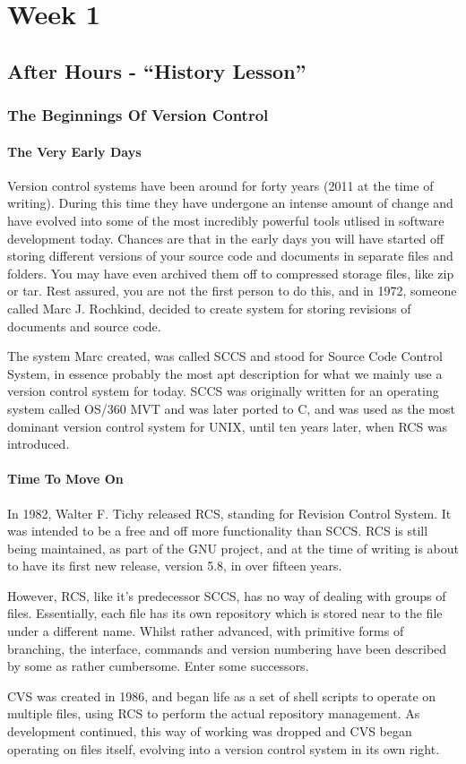 \chapter{Week 1}
\section{After Hours - ``History Lesson''}
\subsection{The Beginnings Of Version Control}

\subsubsection{The Very Early Days}
Version control systems have been around for forty years (2011 at the time of writing).  During this time they have undergone an intense amount of change and have evolved into some of the most incredibly powerful tools utlised in software development today.  Chances are that in the early days you will have started off storing different versions of your source code and documents in separate files and folders.  You may have even archived them off to compressed storage files, like zip or tar.  Rest assured, you are not the first person to do this, and in 1972, someone called Marc J. Rochkind, decided to create system for storing revisions of documents and source code.

The system Marc created, was called SCCS and stood for Source Code Control System, in essence probably the most apt description for what we mainly use a version control system for today.  SCCS was originally written for an operating system called OS/360 MVT and was later ported to C, and was used as the most dominant version control system for UNIX, until ten years later, when RCS was introduced.

\subsubsection{Time To Move On}
In 1982, Walter F. Tichy released RCS, standing for Revision Control System.  It was intended to be a free and off more functionality than SCCS.  RCS is still being maintained, as part of the GNU project, and at the time of writing is about to have its first new release, version 5.8, in over fifteen years.

However, RCS, like it's predecessor SCCS, has no way of dealing with groups of files.  Essentially, each file has its own repository which is stored near to the file under a different name.  Whilst rather advanced, with primitive forms of branching, the interface, commands and version numbering have been described by some as rather cumbersome.  Enter some successors.

CVS was created in 1986, and began life as a set of shell scripts to operate on multiple files, using RCS to perform the actual repository management.  As development continued, this way of working was dropped and CVS began operating on files itself, evolving into a version control system in its own right.
